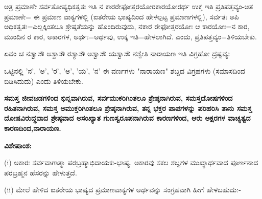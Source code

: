 ಅತ್ರ ಪ್ರಮಾಣೇ ಸರ್ವತೋಪ್ಯಧಿಕತ್ವತಃ ಇತಿ ನ ಕಾರರೇಫೋತ್ತರಯೋರಕಾರಯೋರರ್ಥ ಉಕ್ತ ಇತಿ ಪ್ರತಿಪತ್ತವ್ಯಂ-ಅತ ಪ್ರಮಾಣೇ= ಈ ಪ್ರಮಾಣ ವಾಕ್ಯಗಳಲ್ಲಿ (ಐತರೇಯ ಭಾಷ್ಯದಿಂದ ಹೇಳಲ್ಪಟ್ಟ ಪ್ರಮಾಣಗಳಲ್ಲಿ), ಸರ್ವತಃ ಅಪಿ ಅಧಿಕತ್ವತಃ=ಎಲ್ಲಕ್ಕಿಂತಲೂ ಶ್ರೇಷ್ಠತೆಯನ್ನು ಹೊಂದಿರುವುದು, ನಕಾರ ರೇಫೋತ್ತರಯೋಃ ಆ ಕಾರಯೋಃ=ನ ಕಾರ, ಮುಂದಿನ ರ ಕಾರ, ಅಕಾರಗಳ, ಅರ್ಥಃ=ಅರ್ಥವು, ಉಕ್ಕ ಇತಿ=ಹೇಳಲಾಗಿದೆ. ಎಂದು, ಪ್ರತಿ\-ಪತ್ತವ್ಯಂ=ತಿಳಿಯಬೇಕು.

ಏವಂ ಚ ನಶ್ವಾಸೌ ಅಶ್ಚಾಸೌ ರಶ್ಯಾಸೌ ಅಶ್ವಾಸೌ ಯಶ್ವಾಸೌ ನಶ್ವೇತಿ ನಾರಾಯಣ ಇತಿ ವಿಗ್ರಹೋ ದ್ರಷ್ಟವ್ಯಃ

ಒಟ್ಟಿನಲ್ಲಿ 'ನ', 'ಅ', 'ರ', 'ಅ', 'ಯ', 'ನ' ಈ ವರ್ಣಗಳು "ನಾರಾಯಣ" ಶಬ್ದದ ವಿಗ್ರಹಗಳು (ಸಮಾಸದಿಂದ ಬಿಡಿಸಿದುದು) ಎಂದು ತಿಳಿಯಬೇಕು.

\textbf{ಸಮಸ್ತ ಜೀವಜಡಗಳಿಂದ ಭಿನ್ನವಾಗಿರುವ, ಸರ್ವಮುಕರಿಗಿಂತಲೂ ಶ್ರೇಷ್ಠನಾಗಿರುವ, ಸಮಸ್ತದೋಷಗಳಿಂದ ರಹಿತನಾಗಿರುವ, ಸಮಸ್ತ ಅಮುಕ್ತರಿಗಿಂತಲೂ ಶ್ರೇಷ್ಠನಾಗಿರುವ, ತನ್ನ ಭಕ್ತರ ಪಾಪಗಳನ್ನು ಪರಿಹರಿಸಿ ತಾನು ಸಮಸ್ತ ದೋಷವಿರುದ್ಧವಾದ ಶ್ರೇಷ್ಠವಾದ ಅಸಂಖ್ಯಾತ ಗುಣಸ್ವರೂಪನಾಗಿರುವ ಕಾರಣಗಳಿಂದ, ಆರು ಅಕ್ಷರಗಳ ವಾಚ್ಯತ್ವದ ಕಾರಣದಿಂದ,\break ನಾರಾಯಣ.}

\noindent
\textbf{ವಿಶೇಷಾಂಶ:\enginline{-}}

(i) ಅಕಾರಃ ಸರ್ವವಾಗಾತ್ಮಾ ಪರಬ್ರಹ್ಮಾಭಿದಾಯಕಃ-ಭಾಷ್ಯ. ಅಕಾರವು ಸಕಲ ಶಬ್ದಗಳ ಮುಖ್ಯಾರ್ಥವಾದ ಪೂರ್ಣನಾದ ಪರಬ್ರಹ್ಮನ ಹೆಸರನ್ನು ಹೇಳುತ್ತದೆ.

(ii) ಮೇಲೆ ಹೇಳಿದ ಐತರೇಯ ಭಾಷ್ಯದ ಪ್ರಮಾಣವಾಕ್ಯಗಳ ಅರ್ಥವನ್ನು ಸಂಗ್ರಹವಾಗಿ ಹೀಗೆ ಹೇಳಬಹುದು:-

